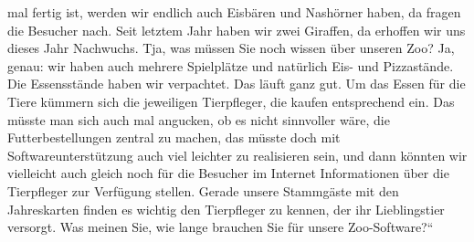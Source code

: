 mal fertig ist, werden wir endlich auch Eisbären und Nashörner haben, da fragen die Besucher nach. Seit letztem Jahr haben wir zwei Giraffen, da erhoffen wir uns dieses Jahr Nachwuchs. Tja, was müssen Sie noch wissen über unseren Zoo? Ja, genau: wir haben auch mehrere Spielplätze und natürlich Eis- und Pizzastände. Die Essensstände haben wir verpachtet. Das läuft ganz gut. Um das Essen für die Tiere kümmern sich die jeweiligen Tier\-pfleger, die kaufen entsprechend ein. Das müsste man sich auch mal angucken, ob es nicht sinnvoller wäre, die Futterbestellungen zentral zu machen, das müsste doch mit Softwareunterstützung auch viel leichter zu realisieren sein, und dann könnten wir vielleicht auch gleich noch für die Besucher im Internet Informationen über die Tierpfleger zur Verfügung stellen. Gerade unsere Stammgäste mit den Jahreskarten finden es wichtig den Tierpfleger zu kennen, der ihr Lieblingstier versorgt. Was meinen Sie, wie lange brauchen Sie für unsere Zoo-Software?“